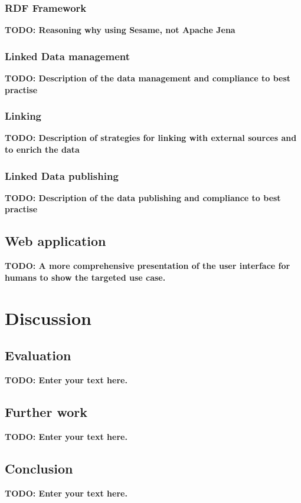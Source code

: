 \documentclass[draft,final]{vutinfth} %
\newcommand{\todo}[1]{{\color{red}\textbf{TODO: {#1}}}} %
\begin{document}
\subsection{RDF Framework}
\todo{Reasoning why using Sesame, not Apache Jena}

\subsection{Linked Data management}
\todo{Description of the data management and compliance to best practise}

\subsection{Linking}
\todo{Description of strategies for linking with external sources and to enrich the data}

\subsection{Linked Data publishing}
\todo{Description of the data publishing and compliance to best practise}

\section{Web application}
\todo{A more comprehensive presentation of the user interface for humans to show the targeted use case.}

\chapter{Discussion}
\label{discussion-chapter}

\section{Evaluation}
\todo{Enter your text here.}

\section{Further work}
\todo{Enter your text here.}

\section{Conclusion}

\todo{Enter your text here.}

\end{document}
